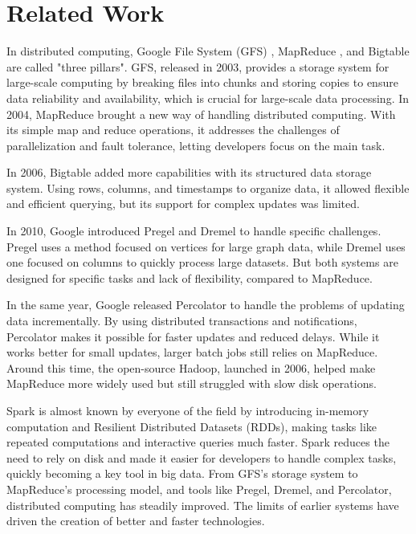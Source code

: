\section{Related Work}
\label{sec:relatedwork}

In distributed computing, Google File System (GFS) \cite{ghemawat2003google}, MapReduce \cite{dean2008mapreduce}, and Bigtable \cite{chang2008bigtable} are called "three pillars". GFS, released in 2003, provides a storage system for large-scale computing by breaking files into chunks and storing copies to ensure data reliability and availability, which is crucial for large-scale data processing. In 2004, MapReduce brought a new way of handling distributed computing. With its simple map and reduce operations, it addresses the challenges of parallelization and fault tolerance, letting developers focus on the main task. 

In 2006, Bigtable \cite{chang2008bigtable} added more capabilities with its structured data storage system. Using rows, columns, and timestamps to organize data, it allowed flexible and efficient querying, but its support for complex updates was limited.

In 2010, Google introduced Pregel \cite{malewicz2010pregel} and Dremel \cite{melnik2010dremel} to handle specific challenges. Pregel uses a method focused on vertices for large graph data, while Dremel uses one focused on columns to quickly process large datasets. But both systems are designed for specific tasks and lack of flexibility, compared to MapReduce.

In the same year, Google released Percolator to handle the problems of updating data incrementally. By using distributed transactions and notifications, Percolator makes it possible for faster updates and reduced delays. While it works better for small updates, larger batch jobs still relies on MapReduce. Around this time, the open-source Hadoop, launched in 2006, helped make MapReduce more widely used but still struggled with slow disk operations.

Spark \cite{zaharia2016apache} is almost known by everyone of the field by introducing in-memory computation and Resilient Distributed Datasets (RDDs), making tasks like repeated computations and interactive queries much faster. Spark reduces the need to rely on disk and made it easier for developers to handle complex tasks, quickly becoming a key tool in big data. From GFS’s storage system to MapReduce’s processing model, and tools like Pregel, Dremel, and Percolator, distributed computing has steadily improved. The limits of earlier systems have driven the creation of better and faster technologies.


